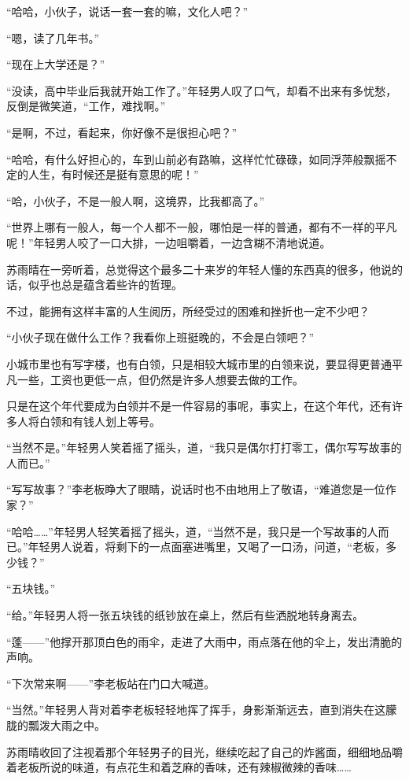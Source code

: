 “哈哈，小伙子，说话一套一套的嘛，文化人吧？”

“嗯，读了几年书。”

“现在上大学还是？”

“没读，高中毕业后我就开始工作了。”年轻男人叹了口气，却看不出来有多忧愁，反倒是微笑道，“工作，难找啊。”

“是啊，不过，看起来，你好像不是很担心吧？”

“哈哈，有什么好担心的，车到山前必有路嘛，这样忙忙碌碌，如同浮萍般飘摇不定的人生，有时候还是挺有意思的呢！”

“哈，小伙子，不是一般人啊，这境界，比我都高了。”

“世界上哪有一般人，每一个人都不一般，哪怕是一样的普通，都有不一样的平凡呢！”年轻男人咬了一口大排，一边咀嚼着，一边含糊不清地说道。

苏雨晴在一旁听着，总觉得这个最多二十来岁的年轻人懂的东西真的很多，他说的话，似乎也总是蕴含着些许的哲理。

不过，能拥有这样丰富的人生阅历，所经受过的困难和挫折也一定不少吧？

“小伙子现在做什么工作？我看你上班挺晚的，不会是白领吧？”

小城市里也有写字楼，也有白领，只是相较大城市里的白领来说，要显得更普通平凡一些，工资也更低一点，但仍然是许多人想要去做的工作。

只是在这个年代要成为白领并不是一件容易的事呢，事实上，在这个年代，还有许多人将白领和有钱人划上等号。

“当然不是。”年轻男人笑着摇了摇头，道，“我只是偶尔打打零工，偶尔写写故事的人而已。”

“写写故事？”李老板睁大了眼睛，说话时也不由地用上了敬语，“难道您是一位作家？”

“哈哈……”年轻男人轻笑着摇了摇头，道，“当然不是，我只是一个写故事的人而已。”年轻男人说着，将剩下的一点面塞进嘴里，又喝了一口汤，问道，“老板，多少钱？”

“五块钱。”

“给。”年轻男人将一张五块钱的纸钞放在桌上，然后有些洒脱地转身离去。

“蓬——”他撑开那顶白色的雨伞，走进了大雨中，雨点落在他的伞上，发出清脆的声响。

“下次常来啊——”李老板站在门口大喊道。

“当然。”年轻男人背对着李老板轻轻地挥了挥手，身影渐渐远去，直到消失在这朦胧的瓢泼大雨之中。

苏雨晴收回了注视着那个年轻男子的目光，继续吃起了自己的炸酱面，细细地品嚼着老板所说的味道，有点花生和着芝麻的香味，还有辣椒微辣的香味……

